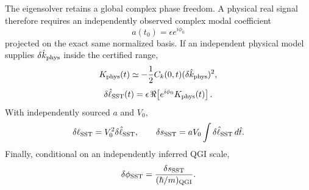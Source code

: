 The eigensolver retains a global complex phase freedom.  A physical real signal therefore requires an independently observed complex modal coefficient
\begin{equation}
a(t_0)=\epsilon e^{i\phi_0}
\end{equation}
projected on the exact same normalized basis.  If an independent physical model supplies $\delta\hat k_{\rm phys}$ inside the certified range,
\begin{equation}
K_{\rm phys}(t)\simeq-\frac12 C_k(0,t)(\delta\hat k_{\rm phys})^2,
\end{equation}
\begin{equation}
\delta\hat\ell_{\rm SST}(t)
=\epsilon\,\Re\!\left[e^{i\phi_0}K_{\rm phys}(t)\right].
\end{equation}
With independently sourced $a$ and $V_0$,
\begin{equation}
\delta\ell_{\rm SST}=V_0^2\delta\hat\ell_{\rm SST},\qquad
\delta s_{\rm SST}=aV_0\int\delta\hat\ell_{\rm SST}\,d\hat t.
\end{equation}
Finally, conditional on an independently inferred QGI scale,
\begin{equation}
\delta\phi_{\rm SST}=\frac{\delta s_{\rm SST}}{(\hbar/m)_{\rm QGI}}.
\end{equation}
